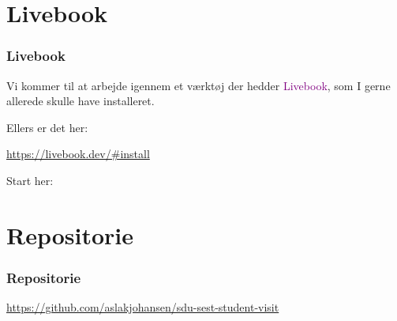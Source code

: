 \section{Livebook}
\begin{frame}
    \frametitle{Livebook}
    \vspace{5mm}
    Vi kommer til at arbejde igennem et værktøj der hedder \textcolor{purple}{Livebook}, som I gerne allerede skulle have installeret.
    
    \vspace{7mm}
    Ellers er det her:
    \begin{center}
      \url{https://livebook.dev/\#install}
    \end{center}
    
    \vspace{7mm}
    Start her:
    \begin{center}
    \end{center}
\end{frame}

\section{Repositorie}
\begin{frame}
    \frametitle{Repositorie}
    \begin{center}
    
      \vspace{4mm}
      \url{https://github.com/aslakjohansen/sdu-sest-student-visit}
    \end{center}
\end{frame}

